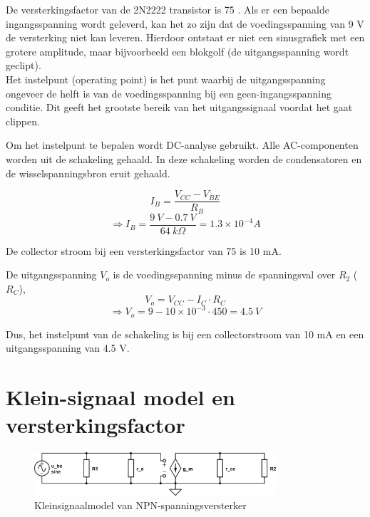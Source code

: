 \documentclass{report}
\begin{document}
De versterkingsfactor van de 2N2222 transistor is 75 \cite[p.~3]{epo2-non-linear}. Als er een bepaalde ingangsspanning wordt geleverd, kan het zo zijn dat de voedingsspanning van 9 V de versterking niet kan leveren. Hierdoor ontstaat er niet een sinusgrafiek met een grotere amplitude, maar bijvoorbeeld een blokgolf (de uitgangsspanning wordt geclipt).\\

Het instelpunt (operating point) is het punt waarbij de uitgangsspanning ongeveer de helft is van de voedingsspanning bij een geen-ingangsspanning conditie. Dit geeft het grootste bereik van het uitgangssignaal voordat het gaat clippen. 

Om het instelpunt te bepalen wordt DC-analyse gebruikt. Alle AC-componenten worden uit de schakeling gehaald. In deze schakeling worden de condensatoren en de wisselspanningsbron eruit gehaald.

\begin{equation}
I_B=\frac{V_{CC}-V_{BE}}{R_B}
\end{equation}
$$\Rightarrow I_B=\frac{9\: V-0.7 \: V}{64 \: k \Omega}=1.3\times 10^{-4}A$$

\noindent De collector stroom bij een versterkingsfactor van 75 is 10 mA. 

\noindent De uitgangsspanning $V_o$ is de voedingsspanning minus de spanningsval over $R_2$ ($R_C$),
\begin{equation}
V_o=V_{CC}-I_{C} \cdot R_{C}
\end{equation}
$$\Rightarrow V_o=9-10\times 10^{-3}\cdot 450=4.5 \: V$$

\noindent Dus, het instelpunt van de schakeling is bij een collectorstroom van 10 mA en een uitgangsspanning van 4.5 V.

\chapter{Klein-signaal model en versterkingsfactor}

\begin{figure}[H]
	\centering
	\label{fig:npn-amplifier-kleinsignaal}
	\includegraphics[width=0.8\textwidth]{resource/npn-kleinsignaal-versterker}
	\caption{Kleinsignaalmodel van NPN-spanningsversterker}
\end{figure}
\end{document}
